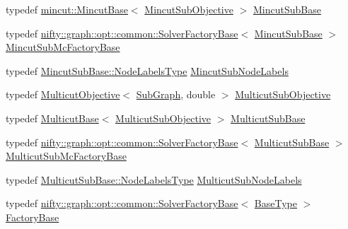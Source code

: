 \begin{DoxyCompactItemize}
\item 
typedef \hyperlink{classnifty_1_1graph_1_1opt_1_1mincut_1_1MincutBase}{mincut\+::\+Mincut\+Base}$<$ \hyperlink{classnifty_1_1graph_1_1opt_1_1multicut_1_1Cgc_ad046a519bbf2e0753e9bb0db0ce62fa0}{Mincut\+Sub\+Objective} $>$ \hyperlink{classnifty_1_1graph_1_1opt_1_1multicut_1_1Cgc_a57213162712293e98b9bdce03350ae90}{Mincut\+Sub\+Base}
\item 
typedef \hyperlink{classnifty_1_1graph_1_1opt_1_1common_1_1SolverFactoryBase}{nifty\+::graph\+::opt\+::common\+::\+Solver\+Factory\+Base}$<$ \hyperlink{classnifty_1_1graph_1_1opt_1_1multicut_1_1Cgc_a57213162712293e98b9bdce03350ae90}{Mincut\+Sub\+Base} $>$ \hyperlink{classnifty_1_1graph_1_1opt_1_1multicut_1_1Cgc_ae8877e2556e794a6c14da9cf805d0f5f}{Mincut\+Sub\+Mc\+Factory\+Base}
\item 
typedef \hyperlink{classnifty_1_1graph_1_1opt_1_1common_1_1SolverBase_abefd51561de2fd009f6bed6bef6009ea}{Mincut\+Sub\+Base\+::\+Node\+Labels\+Type} \hyperlink{classnifty_1_1graph_1_1opt_1_1multicut_1_1Cgc_a46705d271083c2d68cca9dc7af49ac2e}{Mincut\+Sub\+Node\+Labels}
\item 
typedef \hyperlink{classnifty_1_1graph_1_1opt_1_1multicut_1_1MulticutObjective}{Multicut\+Objective}$<$ \hyperlink{classnifty_1_1graph_1_1opt_1_1multicut_1_1Cgc_a52317a6524a87782b8c6cc8cd27fa9fc}{Sub\+Graph}, double $>$ \hyperlink{classnifty_1_1graph_1_1opt_1_1multicut_1_1Cgc_a19a2390f261fe4c0cdcbff8049e4519b}{Multicut\+Sub\+Objective}
\item 
typedef \hyperlink{classnifty_1_1graph_1_1opt_1_1multicut_1_1MulticutBase}{Multicut\+Base}$<$ \hyperlink{classnifty_1_1graph_1_1opt_1_1multicut_1_1Cgc_a19a2390f261fe4c0cdcbff8049e4519b}{Multicut\+Sub\+Objective} $>$ \hyperlink{classnifty_1_1graph_1_1opt_1_1multicut_1_1Cgc_a9b537dda6c66a9b60656dddd1a9ade4d}{Multicut\+Sub\+Base}
\item 
typedef \hyperlink{classnifty_1_1graph_1_1opt_1_1common_1_1SolverFactoryBase}{nifty\+::graph\+::opt\+::common\+::\+Solver\+Factory\+Base}$<$ \hyperlink{classnifty_1_1graph_1_1opt_1_1multicut_1_1Cgc_a9b537dda6c66a9b60656dddd1a9ade4d}{Multicut\+Sub\+Base} $>$ \hyperlink{classnifty_1_1graph_1_1opt_1_1multicut_1_1Cgc_ac0d77f789b221087aac1d2bb4f1cd2da}{Multicut\+Sub\+Mc\+Factory\+Base}
\item 
typedef \hyperlink{classnifty_1_1graph_1_1opt_1_1common_1_1SolverBase_abefd51561de2fd009f6bed6bef6009ea}{Multicut\+Sub\+Base\+::\+Node\+Labels\+Type} \hyperlink{classnifty_1_1graph_1_1opt_1_1multicut_1_1Cgc_a949c61ec3b2f609aa78abc2e7eef05e2}{Multicut\+Sub\+Node\+Labels}
\item 
typedef \hyperlink{classnifty_1_1graph_1_1opt_1_1common_1_1SolverFactoryBase}{nifty\+::graph\+::opt\+::common\+::\+Solver\+Factory\+Base}$<$ \hyperlink{classnifty_1_1graph_1_1opt_1_1multicut_1_1Cgc_ad2d9dfafea18de663be6d8d606208eec}{Base\+Type} $>$ \hyperlink{classnifty_1_1graph_1_1opt_1_1multicut_1_1Cgc_a2ce012f31f0652bc12958f2547579020}{Factory\+Base}
\end{DoxyCompactItemize}
